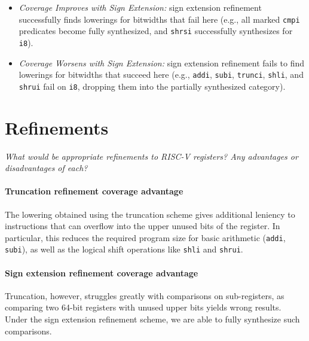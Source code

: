 \begin{table}[htpb]
    \vspace{0.2cm}
    \raggedright
    \begin{itemize}
        \item[$^{\uparrow}$] \emph{Coverage Improves with Sign Extension:} sign extension refinement successfully finds lowerings for bitwidths that fail here (e.g., all marked \texttt{cmpi} predicates become fully synthesized, and \texttt{shrsi} successfully synthesizes for \texttt{i8}). 
        \item[$^{\downarrow}$] \emph{Coverage Worsens with Sign Extension:} sign extension refinement fails to find lowerings for bitwidths that succeed here (e.g., \texttt{addi}, \texttt{subi}, \texttt{trunci}, \texttt{shli}, and \texttt{shrui} fail on \texttt{i8}, dropping them into the partially synthesized category).
    \end{itemize}
    \label{tab:lowering_coverage}
\end{table}

\section{Refinements}
\emph{What would be appropriate refinements to RISC-V registers? Any advantages or disadvantages of each?}
\label{eval-refinements}

\paragraph{Truncation refinement coverage advantage}

The lowering obtained using the truncation scheme gives additional leniency to instructions
that can overflow into the upper unused bits of the register. In particular, this reduces
the required program size for basic arithmetic (\texttt{addi}, \texttt{subi}), as well as 
the logical shift operations like \texttt{shli} and \texttt{shrui}.

\paragraph{Sign extension refinement coverage advantage} Truncation, however, struggles greatly
with comparisons on sub-registers, as comparing two 64-bit registers with unused upper
bits yields wrong results. Under the sign extension refinement scheme, we are able to 
fully synthesize such comparisons.

